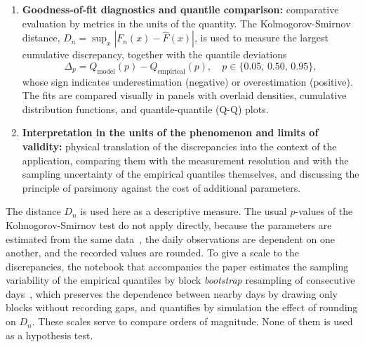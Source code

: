 \begin{enumerate}
    \item \textbf{Goodness-of-fit diagnostics and quantile comparison:} comparative evaluation by metrics in the units of the quantity. The Kolmogorov-Smirnov distance, $D_n = \sup_x |F_n(x) - \widehat{F}(x)|$, is used to measure the largest cumulative discrepancy, together with the quantile deviations
    \begin{equation}
        \Delta_p = Q_{\text{model}}(p) - Q_{\text{empirical}}(p), \quad p \in \{0.05,\, 0.50,\, 0.95\},
        \label{eq:delta}
    \end{equation}
    whose sign indicates underestimation (negative) or overestimation (positive). The fits are compared visually in panels with overlaid densities, cumulative distribution functions, and quantile-quantile (Q-Q) plots.

    \item \textbf{Interpretation in the units of the phenomenon and limits of validity:} physical translation of the discrepancies into the context of the application, comparing them with the measurement resolution and with the sampling uncertainty of the empirical quantiles themselves, and discussing the principle of parsimony against the cost of additional parameters.
\end{enumerate}

The distance $D_n$ is used here as a descriptive measure. The usual $p$-values of the Kolmogorov-Smirnov test do not apply directly, because the parameters are estimated from the same data~\cite{lilliefors1967}, the daily observations are dependent on one another, and the recorded values are rounded. To give a scale to the discrepancies, the notebook that accompanies the paper estimates the sampling variability of the empirical quantiles by block \textit{bootstrap} resampling of consecutive days~\cite{kunsch1989}, which preserves the dependence between nearby days by drawing only blocks without recording gaps, and quantifies by simulation the effect of rounding on $D_n$. These scales serve to compare orders of magnitude. None of them is used as a hypothesis test.
